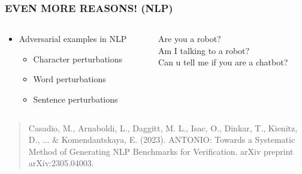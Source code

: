 \documentclass[t,compress,aspectratio=169]{beamer}
\begin{document}
\begin{frame}
\frametitle{EVEN MORE REASONS! (NLP)}

\begin{columns}[c]
    \begin{column}{.5\textwidth}
        \begin{itemize}    \Large

            \item Adversarial examples in NLP
            \begin{itemize}    \Large

                \item Character perturbations
                \item Word perturbations
                \item \textcolor{aisecred}{Sentence perturbations}
            \end{itemize}
        \end{itemize}
    \end{column}
    \begin{column}{.5\textwidth}
    \begin{center}    \Large

        \textcolor{aisecpurple}{Are you a robot?}\\
        \textcolor{aisecred}{Am I talking to }\textcolor{aisecpurple}{a robot?}\\
        \textcolor{aisecred}{Can u tell me if you are a chatbot?}
    \end{center}
    \end{column}
\end{columns}
\vfill
	\begin{quote}
		\tiny Casadio, M., {{Arnaboldi, L.}}, Daggitt, M. L., Isac, O., Dinkar, T., Kienitz, D., ... \& Komendantskaya, E. (2023). ANTONIO: Towards a Systematic Method of Generating NLP Benchmarks for Verification. arXiv preprint arXiv:2305.04003.
		
	\end{quote}
\end{frame}
\end{document}
